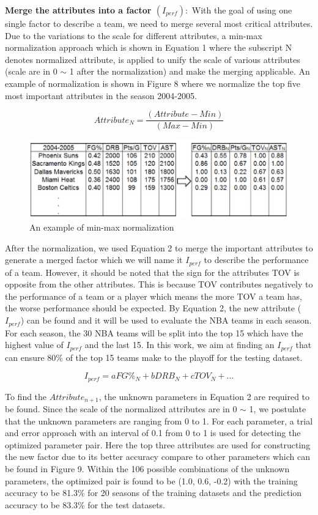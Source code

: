 \documentclass{acm_proc_article-sp}
\begin{document}
\textbf{Merge the attributes into a factor $(I_{perf}):$} With the goal of using one single factor to describe a team, we need to merge several most critical attributes. Due to the variations to the scale for different attributes, a min-max normalization approach which is shown in Equation 1 where the subscript N denotes normalized attribute, is applied to unify the scale of various attributes (scale are in 0 $\sim$ 1 after the normalization) and make the merging applicable. An example of normalization is shown in Figure 8 where we normalize the top five most important attributes in the season 2004-2005.

\begin{equation}
Attribute_N = \frac{(Attribute - Min)}{(Max - Min)}
\end{equation}

\begin{figure}[!htb]
\includegraphics{Fig-8.png}
\caption{An example of min-max normalization}
\end{figure}

After the normalization, we used Equation 2 to merge the important attributes to generate a merged factor which we will name it $I_{perf}$ to describe the performance of a team. However, it should be noted that the sign for the attributes TOV is opposite from the other attributes. This is because TOV contributes negatively to the performance of a team or a player which means the more TOV a team has, the worse performance should be expected. By Equation 2, the new attribute ($I_{perf}$) can be found and it will be used to evaluate the NBA teams in each season. For each season, the 30 NBA teams will be split into the top 15 which have the highest value of $I_{perf}$ and the last 15. In this work, we aim at finding an $I_{perf}$ that can ensure 80\% of the top 15 teams make to the playoff for the testing dataset.

\begin{equation}
I_{perf} = aFG\%_{N} + bDRB_{N} + cTOV_{N} + ...
\end{equation}

To find the $Attribute_{n+1}$, the unknown parameters in Equation 2 are required to be found. Since the scale of the normalized attributes are in 0 $\sim$ 1, we postulate that the unknown parameters are ranging from 0 to 1. For each parameter, a trial and error approach with an interval of 0.1 from 0 to 1 is used for detecting the optimized parameter pair. Here the top three attributes are used for constructing the new factor due to its better accuracy compare to other parameters which can be found in Figure 9. Within the 106 possible combinations of the unknown parameters, the optimized pair is found to be (1.0, 0.6, -0.2) with the training accuracy to be 81.3\% for 20 seasons of the training datasets and the prediction accuracy to be 83.3\% for the test datasets.
\end{document}
